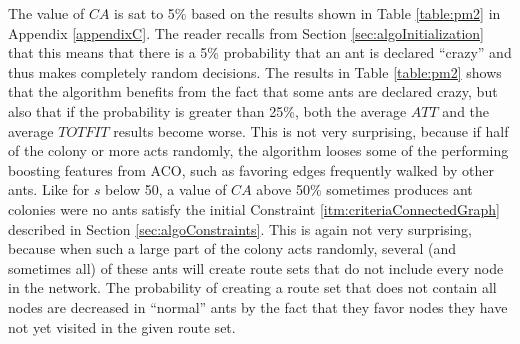 
The value of $CA$ is sat to 5\% based on the results shown in Table \vref{table:pm2} in Appendix \ref{appendixC}. The reader recalls from Section \vref{sec:algoInitialization} that this means that there is a 5\% probability that an ant is declared ``crazy'' and thus makes completely random decisions. The results in Table \vref{table:pm2} shows that the algorithm benefits from the fact that some ants are declared crazy, but also that if the probability is greater than 25\%, both the average $ATT$ and the average $TOTFIT$ results become worse. This is not very surprising, because if half of the colony or more acts randomly, the algorithm looses some of the performing boosting features from ACO, such as favoring edges frequently walked by other ants. Like for $s$ below 50, a value of $CA$ above 50\% sometimes produces ant colonies were no ants satisfy the initial Constraint \ref{itm:criteriaConnectedGraph} described in Section \vref{sec:algoConstraints}. This is again not very surprising, because when such a large part of the colony acts randomly, several (and sometimes all) of these ants will create route sets that do not include every node in the network. The probability of creating a route set that does not contain all nodes are decreased in ``normal'' ants by the fact that they favor nodes they have not yet visited in the given route set. 

